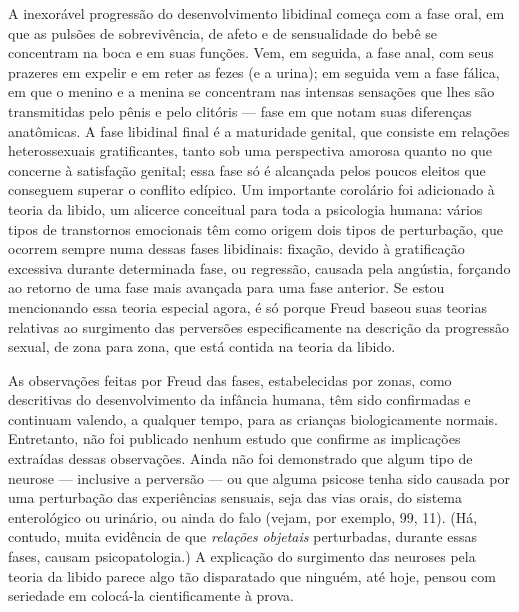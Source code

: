  A inexorável progressão do desenvolvimento libidinal começa com a fase oral,\idxforal{} em que as pulsões de sobrevivência, de afeto e de sensualidade do bebê se concentram na boca e em suas funções. Vem, em seguida, a fase anal,\idxfanal{} com seus prazeres em expelir e em reter as fezes (e a urina); em seguida vem a fase fálica,\idxfasef{} em que o menino e a menina se concentram nas intensas sensações que lhes são transmitidas pelo pênis e pelo clitóris --- fase em que notam suas diferenças anatômicas. A fase\idxgenetfase{} libidinal final é a maturidade genital,\idxconfematu{} que consiste em relações heterossexuais\idxheterofase{} gratificantes, tanto sob uma perspectiva amorosa quanto no que concerne à satisfação genital; essa fase só é alcançada pelos poucos eleitos que conseguem superar o conflito edípico. Um importante corolário foi adicionado à teoria da libido, um alicerce conceitual para toda a psicologia humana: vários tipos de transtornos emocionais têm como origem dois tipos de perturbação, que ocorrem sempre numa dessas fases
libidinais: fixação,\idxlibidfixa{} devido à gratificação excessiva durante determinada fase, ou regressão, causada pela angústia, forçando ao retorno de uma fase mais avançada para uma fase anterior. Se estou mencionando essa teoria especial agora, é só porque Freud baseou suas teorias relativas ao surgimento das perversões especificamente na descrição da progressão sexual, de zona para zona, que está contida na
teoria da libido.

 As observações feitas por Freud das fases, estabelecidas por zonas,
como descritivas do desenvolvimento da infância humana, têm sido
confirmadas e continuam valendo, a qualquer tempo, para as crianças
biologicamente normais. Entretanto, não foi publicado nenhum estudo que
confirme as implicações extraídas dessas observações. Ainda não foi
demonstrado que algum tipo de neurose\idxneuro{} --- inclusive a perversão --- ou que
alguma psicose tenha sido causada por uma perturbação das experiências
sensuais, seja das vias orais, do sistema enterológico ou urinário, ou
ainda do falo (vejam, por exemplo, 99, 11). (Há, contudo, muita
evidência de que \textit{relações} \textit{objetais} perturbadas,
durante essas fases, causam psicopatologia.) A explicação do surgimento
das neuroses pela \mbox{teoria} da libido parece algo tão disparatado que
ninguém, até hoje, pensou com seriedade em colocá-la cientificamente à
prova.

